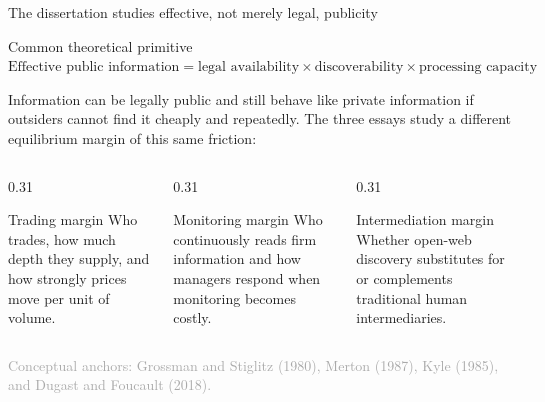 \documentclass[aspectratio=169,10pt]{beamer}
\newcommand{\source}[1]{\vfill{\scriptsize\textcolor{DarkGray}{#1}}}
\begin{document}
\begin{frame}[t]{The dissertation studies effective, not merely legal, publicity}
\begin{block}{Common theoretical primitive}
\centering
\Large
$\text{Effective public information}
=
\text{legal availability}
\times
\text{discoverability}
\times
\text{processing capacity}$
\end{block}

\vspace{0.18cm}
\small
Information can be legally public and still behave like private information if outsiders cannot find it cheaply and repeatedly. The three essays study a different equilibrium margin of this same friction:

\vspace{0.18cm}
\begin{columns}[T,onlytextwidth]
  \begin{column}{0.31\textwidth}
    \begin{exampleblock}{Trading margin}
      Who trades, how much depth they supply, and how strongly prices move per unit of volume.
    \end{exampleblock}
  \end{column}
  \begin{column}{0.31\textwidth}
    \begin{exampleblock}{Monitoring margin}
      Who continuously reads firm information and how managers respond when monitoring becomes costly.
    \end{exampleblock}
  \end{column}
  \begin{column}{0.31\textwidth}
    \begin{exampleblock}{Intermediation margin}
      Whether open-web discovery substitutes for or complements traditional human intermediaries.
    \end{exampleblock}
  \end{column}
\end{columns}

\source{Conceptual anchors: Grossman and Stiglitz (1980), Merton (1987), Kyle (1985), and Dugast and Foucault (2018).}
\end{frame}
\end{document}
